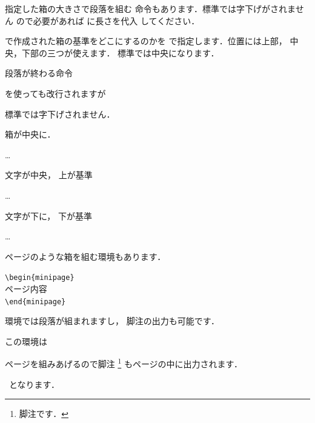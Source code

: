 指定した箱の大きさで段落を組む 
命令もあります．標準では字下げがされません%
ので必要があれば に長さを代入
してください．
\begin{Syntax}
%
\end{Syntax}
で作成された箱の基準をどこにするのかを
で指定します．位置には上部，
中央，下部の三つが使えます．
標準では中央になります．
\begin{InOut}
\parbox{13zw}{段落が終わる命令\par
を使っても改行されますが\par
標準では字下げされません．}
\end{InOut}
\begin{InOut}
\parbox[c]{4zw}{箱が中央に．}\ldots
\parbox[t][3zw][c]{4zw}{文字が中央，
上が基準}\ldots 
\parbox[b][3zw][t]{4zw}{文字が下に，
下が基準}\ldots
\end{InOut}
ページのような箱を組む環境もあります．
\begin{Syntax}
\verb|\begin{minipage}|\\
ページ内容\\
\verb|\end{minipage}|
\end{Syntax}
環境では段落が組まれますし，
脚注の出力も可能です．%
%
\begin{InOut}
この環境は~
\begin{minipage}[t]{7zw}
ページを組みあげるので脚注%
\footnote{脚注です．}
もページの中に出力されます．
\end{minipage} 
~となります．
\end{InOut}

